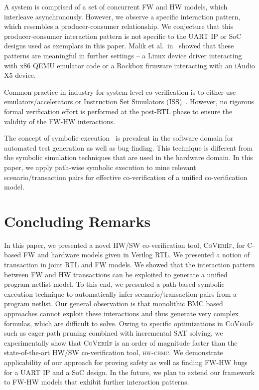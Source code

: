 \documentclass[sigconf]{acmart}
\newcommand{\tool}[1]{\textsc{#1}\xspace}
\newcommand{\hwcbmcv}{\tool{hw-cbmc}}
\newcommand{\verifox}{\tool{CoVeriIf}}
\begin{document}
A system is comprised of a set of concurrent FW and HW models, which
interleave asynchronously.  However, we observe a specific interaction
pattern, which resembles a producer-consumer relationship.  We conjecture
that this producer-consumer interaction pattern is not specific to the UART
IP or SoC designs used as exemplars in this paper.  Malik et
al.~in~\cite{hvc} showed that these patterns are meaningful in further
settings -- a Linux device driver interacting with x86 QEMU emulator code or
a Rockbox firmware interacting with an iAudio X5 device.

Common practice in industry for system-level co-verification is to 
either use emulators/accelerators or Instruction Set Simulators 
(ISS)~\cite{coverif-book}.  However, no rigorous formal verification 
effort is performed at the post-RTL phase to ensure the validity of the
FW-HW interactions.  

The concept of symbolic execution~\cite{DBLP:journals/tse/Clarke76,
DBLP:conf/pldi/GodefroidKS05, DBLP:conf/osdi/CadarDE08} is prevalent in the
software domain for automated test generation as well as bug finding.  This
technique is different from the symbolic simulation techniques that are used
in the hardware domain.  In this paper, we apply path-wise symbolic execution
to mine relevant scenario/transaction pairs for effective co-verification of 
a unified co-verification model.  

\section{Concluding Remarks}

In this paper, we presented a novel HW/SW co-verification tool, \verifox,
for C-based FW and hardware models given in Verilog RTL.  We presented a
notion of transaction in joint RTL and FW models.  We showed that the
interaction pattern between FW and HW transactions can be exploited to
generate a unified program netlist model.  To this end, we presented a
path-based symbolic execution technique to automatically infer
scenario/transaction pairs from a program netlist.  Our general observation
is that monolithic BMC based approaches cannot exploit these interactions
and thus generate very complex formulas, which are difficult to solve. 
Owing to specific optimizations in \verifox such as eager path pruning
combined with incremental SAT solving, we experimentally show that \verifox
is an order of magnitude faster than the state-of-the-art HW/SW
co-verification tool, \hwcbmcv.  We demonstrate applicability of our
approach for proving safety as well as finding FW-HW bugs for a UART IP and
a SoC design.  In the future, we plan to extend our framework to FW-HW
models that exhibit further interaction patterns.


 
\end{document}
